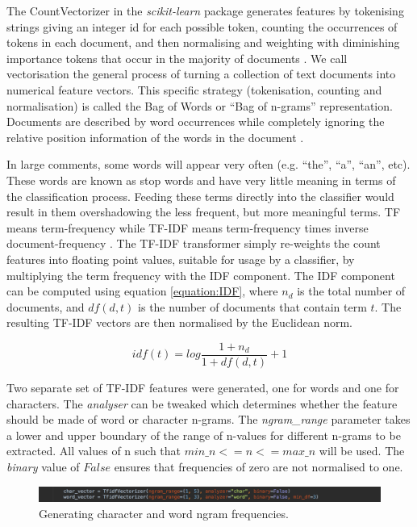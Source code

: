 The CountVectorizer in the \emph{scikit-learn} package generates features by tokenising strings giving an integer id for each possible token, counting the occurrences of tokens in each document, and then normalising and weighting with diminishing importance tokens that occur in the majority of documents \cite{scikit:tfidf}. We call vectorisation the general process of turning a collection of text documents into numerical feature vectors. This specific strategy (tokenisation, counting and normalisation) is called the Bag of Words or ``Bag of n-grams'' representation. Documents are described by word occurrences while completely ignoring the relative position information of the words in the document \cite{scikit:tfidf}.

In large comments, some words will appear very often (e.g. ``the'', ``a'', ``an'', etc). These words are known as stop words and have very little meaning in terms of the classification process. Feeding these terms directly into the classifier would result in them overshadowing the less frequent, but more meaningful terms. TF means term-frequency while TF-IDF means term-frequency times inverse document-frequency \cite{scikit:tfidf}. The TF-IDF transformer simply re-weights the count features into floating point values, suitable for usage by a classifier, by multiplying the term frequency with the IDF component. The IDF component can be computed using equation \ref{equation:IDF}, where $n_{d}$ is the total number of documents, and $df(d,t)$ is the number of documents that contain term $t$. The resulting TF-IDF vectors are then normalised by the Euclidean norm.

\begin{equation}
    idf(t) = log\frac{1 + n_{d}}{1 + df(d, t)} + 1
    \label{equation:IDF}
\end{equation}

Two separate set of TF-IDF features were generated, one for words and one for characters. The \textit{analyser} can be tweaked which determines whether the feature should be made of word or character n-grams. The \textit{ngram\_range} parameter takes a lower and upper boundary of the range of n-values for different n-grams to be extracted. All values of n such that $min\_n <= n <= max\_n$ will be used. The \textit{binary} value of $False$ ensures that frequencies of zero are not normalised to one.

\begin{figure}[H]
    \centering
    \includegraphics[width=\textwidth]{Images/Implementation/DataProcessing/AbuseDetection/TFIDF}
    \caption{Generating character and word ngram frequencies.}
    \label{fig:AbuseDetection-TFIDF}
\end{figure}

